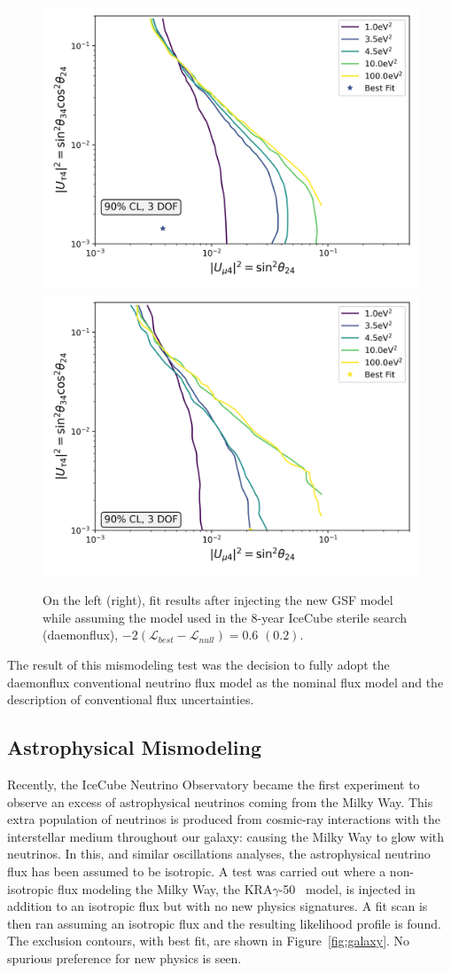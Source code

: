 \documentclass[main.tex]{subfiles}
\begin{document}
\begin{figure}  
    \centering
    \includegraphics[width=0.45\linewidth]{figures/gsfinject_fitbarr_Realization_gsfdaemon_Asimov_sterile_0_cl0.9_dof3.png}
    \includegraphics[width=0.45\linewidth]{figures/gsfinject_fitdaemon_Realization_gsfdaemon_Asimov_sterile_0_cl0.9_dof3.png}
    \caption{On the left (right), fit results after injecting the new GSF model while assuming the model used in the 8-year IceCube sterile search (daemonflux), $-2(\mathcal{L}_{best}-\mathcal{L}_{null})=0.6$ $(0.2)$.}\label{fig:gsf_updates}
\end{figure}

The result of this mismodeling test was the decision to fully adopt the daemonflux conventional neutrino flux model as the nominal flux model and the description of conventional flux uncertainties. 

\subsection{Astrophysical Mismodeling}

Recently, the IceCube Neutrino Observatory became the first experiment to observe an excess of astrophysical neutrinos coming from the Milky Way\cite{doi:10.1126/science.adc9818}. 
This extra population of neutrinos is produced from cosmic-ray interactions with the interstellar medium throughout our galaxy: causing the Milky Way to glow with neutrinos. 
In this, and similar oscillations analyses, the astrophysical neutrino flux has been assumed to be isotropic. 
A test was carried out where a non-isotropic flux modeling the Milky Way, the KRA$\gamma$-50~\cite{Gaggero_2015} model, is injected in addition to an isotropic flux but with no new physics signatures. 
A fit scan is then ran assuming an isotropic flux and the resulting likelihood profile is found. 
The exclusion contours, with best fit, are shown in Figure~\ref{fig:galaxy}.
No spurious preference for new physics is seen. 
\end{document}
